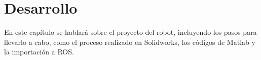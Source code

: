 \chapter{Desarrollo} \label{chap:desarrollo}
En este capítulo se hablará sobre el proyecto del robot, incluyendo los pasos para llevarlo a cabo, como el proceso realizado en Solidworks, los códigos de Matlab y la importación a ROS.